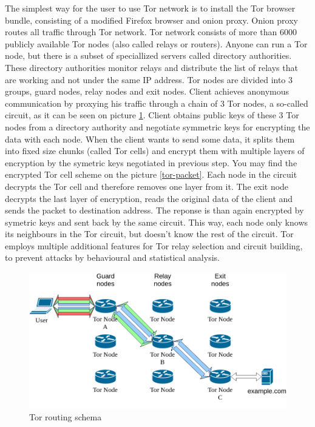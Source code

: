 \documentclass[
  digital, %
  table,   %
  lof,     %
  lot,     %
  oneside
]{fithesis3}
\begin{document}
The simplest way for the user to use Tor network is to install the Tor browser bundle, consisting of
a modified Firefox browser and onion proxy. Onion proxy routes all traffic through Tor network.
Tor network consists of more than 6000 publicly available Tor nodes (also called relays or routers).
Anyone can run a Tor node, but there is a subset of speciallized servers called directory authorities.
These directory authorities monitor relays and distribute the list of relays that are working and 
not under the same IP address.
Tor nodes are divided into 3 groups, guard nodes, relay nodes and exit nodes.
Client achieves anonymous communication by proxying his traffic through
a chain of 3 Tor nodes, a so-called circuit, as it can be seen on picture \ref{tor}.
Client obtains public keys of these 3 Tor nodes from a directory authority and negotiate
symmetric keys for encrypting the data with each node.
When the client wants to send some data, it splits them into fixed size chunks
(called Tor cells) and encrypt them with multiple layers of encryption by the symetric keys negotiated in previous step.
You may find the encrypted Tor cell scheme on the picture \ref{tor-packet}.
Each node in the circuit decrypts the Tor cell and therefore removes one layer from it.
The exit node decrypts the last layer of encryption, reads the original data of the client and 
sends the packet to destination address. The reponse is than again encrypted by symetric keys
and sent back by the same circuit.
This way, each node only knows its neighbours in the Tor circuit, but doesn't know the rest of the circuit.
Tor employs multiple additional features for Tor relay selection and circuit building, to prevent attacks
by behavioural and statistical analysis.
 
\begin{figure}[!htb]
    \centering
    \includegraphics[width=1\textwidth]{tor}
    \caption{Tor routing schema}
    \label{tor}
\end{figure}
 
\end{document}
